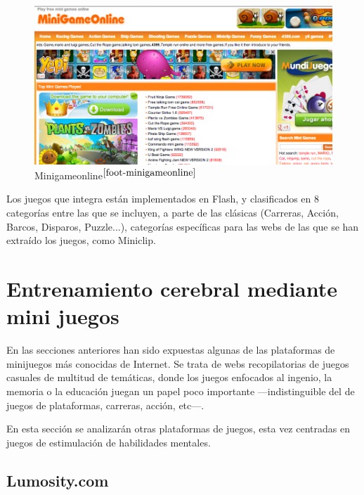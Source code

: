 \begin{figure}[h]
  \begin{center}
    \includegraphics[width=\textwidth]{images/minigameonline.png}
    \caption[Minigameonline]{Minigameonline$^{\ref{foot-minigameonline}}$}
    \label{fig::minigameonline}
  \end{center}
\end{figure}

\addtocounter{footnote}{1}\footnotetext{\label{foot-juegosfan}{\tt http://www.juegosfan.com}}

Los juegos que integra están implementados en Flash, y clasificados en 8 categorías entre las que se incluyen, a parte de las clásicas (Carreras, Acción, Barcos, Disparos, Puzzle...), categorías específicas para las webs de las que se han extraído los juegos, como Miniclip.

\section{Entrenamiento cerebral mediante mini juegos}
\label{sec::webs-de-brain}

En las secciones anteriores han sido expuestas algunas de las plataformas de minijuegos más conocidas de Internet. Se trata de webs recopilatorias de juegos casuales de multitud de temáticas, donde los juegos enfocados al ingenio, la memoria o la educación juegan un papel poco importante ---indistinguible del de juegos de plataformas, carreras, acción, etc---.

En esta sección se analizarán otras plataformas de juegos, esta vez centradas en juegos de estimulación de habilidades mentales.

\subsection*{Lumosity.com}

